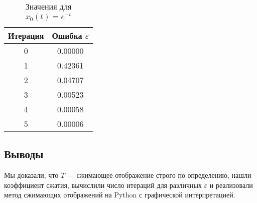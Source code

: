 \documentclass{article}
\begin{document}
\begin{table}[H]
    \centering
    \small
    \setlength{\tabcolsep}{10pt}
    \renewcommand{\arraystretch}{1.2}
    \caption{Значения для $x_0(t) = e^{-t}$}
    \begin{tabular}{c c}
        \toprule
        Итерация & Ошибка $\varepsilon$ \\
        \midrule
        0 & 0.00000 \\
        1 & 0.42361 \\
        2 & 0.04707 \\
        3 & 0.00523 \\
        4 & 0.00058 \\
        5 & 0.00006 \\
        \bottomrule
    \end{tabular}
\end{table}


\newpage
\subsection{Выводы}

Мы доказали, что \( T \) — сжимающее отображение строго по определению, нашли коэффициент сжатия, вычислили число итераций для различных \( \varepsilon \) и реализовали метод сжимающих отображений на Python с графической интерпретацией.
\end{document}
